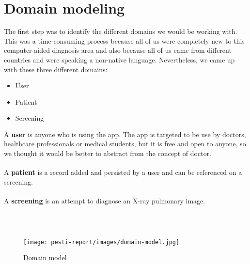 \section{Domain modeling}

The first step was to identify the different domains we would be working with. This was a time-consuming process because all of us were completely new to this computer-aided diagnosis area and also because all of us came from different countries and were speaking a non-native language. Nevertheless, we came up with these three different domains:

\begin{itemize}
\item
User
\item
Patient
\item
Screening
\end{itemize}

A \textbf{user} is anyone who is using the app. The app is targeted to be use by doctors, healthcare professionals or medical students, but it is free and open to anyone, so we thought it would be better to abstract from the concept of doctor.
\\ \\
A \textbf{patient} is a record added and persisted by a user and can be referenced on a screening.
\\ \\
A \textbf{screening} is an attempt to diagnose an X-ray pulmonary image.


\\ \\
\begin{figure}[!h]
	\centering
	\texttt{[image: pesti-report/images/domain-model.jpg]}
	\caption{Domain model}
	\label{fig:domain-model}
\end{figure}
\\
